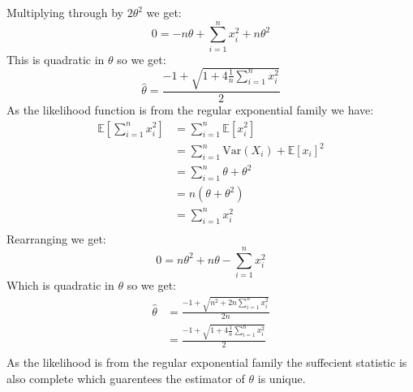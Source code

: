 \documentclass{article}
\begin{document}
Multiplying through by $2\theta^2$ we get:
$$0=-n\theta+\sum_{i=1}^{n}x_i^2+n\theta^2$$
This is quadratic in $\theta$ so we get:
$$\hat{\theta}=\frac{-1+\sqrt{1+4\frac{1}{n}\sum_{i=1}^nx_i^2}}{2}$$
As the likelihood function is from the regular exponential family we have:
\begin{align*}
\mathbb{E}\left[\sum_{i=1}^nx_i^2\right]&=\sum_{i=1}^n\mathbb{E}\left[x_i^2\right]\\
&=\sum_{i=1}^n\text{Var}(X_i)+\mathbb{E}\left[x_i\right]^2\\
&=\sum_{i=1}^n\theta+\theta^2\\
&=n(\theta+\theta^2)\\
&=\sum_{i=1}^nx_i^2\\
\end{align*}
Rearranging we get:
$$0=n\theta^2+n\theta-\sum_{i=1}^nx_i^2$$
Which is quadratic in $\theta$ so we get:
\begin{align*}
\hat{\theta}&=\frac{-1+\sqrt{n^2+2n\sum_{i=1}^nx_i^2}}{2n}\\
&=\frac{-1+\sqrt{1+4\frac{1}{n}\sum_{i=1}^nx_i^2}}{2}\\
\end{align*}
As the likelihood is from the regular exponential family the suffecient statistic is also complete which guarentees the estimator of $\theta$ is unique. 
\end{document}
